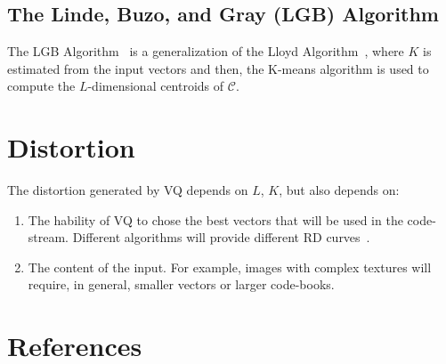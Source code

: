 \subsection{The Linde, Buzo, and Gray (LGB) Algorithm}

The LGB Algorithm~\cite{linde1980algorithm} is a generalization of the
Lloyd Algorithm~\cite{lloyd1982least}, where $K$ is estimated
from the input vectors and then, the K-means algorithm is used to
compute the $L$-dimensional centroids of $\mathcal{C}$.

\section{Distortion}
The distortion generated by VQ depends on $L$, $K$, but also depends
on:
\begin{enumerate}
\item The hability of VQ to chose the best vectors that will be used
  in the code-stream. Different algorithms will provide different RD
  curves~\cite{vruiz__information_theory}.
\item The content of the input. For example, images with complex
  textures will require, in general, smaller vectors or larger
  code-books.
\end{enumerate}

\section{References}

\renewcommand{\addcontentsline}[3]{} %

